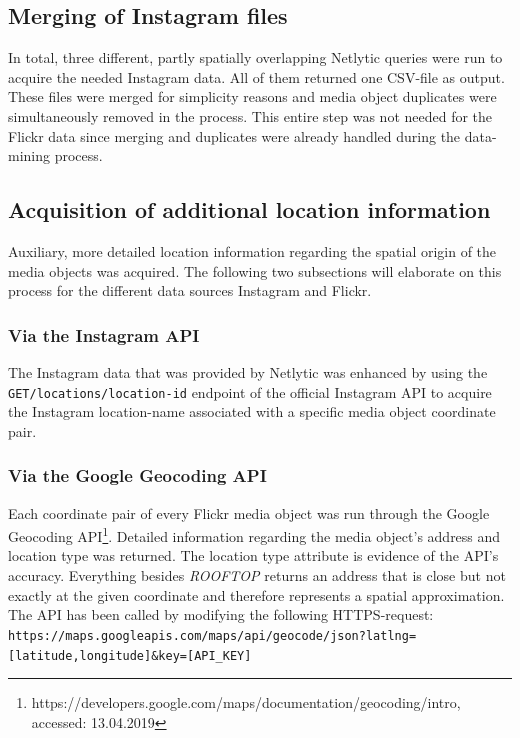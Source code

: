 \subsection{Merging of Instagram files} \label{netlytic_files_merge}
In total, three different, partly spatially overlapping Netlytic queries were run to acquire the needed Instagram data. All of them returned one CSV-file as output. These files were merged for simplicity reasons and media object duplicates were simultaneously removed in the process. This entire step was not needed for the Flickr data since merging and duplicates were already handled during the data-mining process.

\subsection{Acquisition of additional location information} \label{add_location_data}
Auxiliary, more detailed location information regarding the spatial origin of the media objects was acquired. The following two subsections will elaborate on this process for the different data sources Instagram and Flickr.

\subsubsection{Via the Instagram API} \label{geolocation_via_instagramapi}
The Instagram data that was provided by Netlytic was enhanced by using the \\ \texttt{GET/locations/location-id} endpoint of the official Instagram API to acquire the Instagram location-name associated with a specific media object coordinate pair.

\subsubsection{Via the Google Geocoding API} \label{geocoding_api}
Each coordinate pair of every Flickr media object was run through the Google Geocoding API\footnote{https://developers.google.com/maps/documentation/geocoding/intro, accessed: 13.04.2019}. Detailed information regarding the media object's address and location type was returned. The location type attribute is evidence of the API's accuracy. Everything besides \small{\textit{ROOFTOP}} returns an address that is close but not exactly at the given coordinate and therefore represents a spatial approximation. The API has been called by modifying the following HTTPS-request:\\
\texttt{\footnotesize{https://maps.googleapis.com/maps/api/geocode/json?latlng=[latitude,longitude]\&key=[API\_KEY]}}

